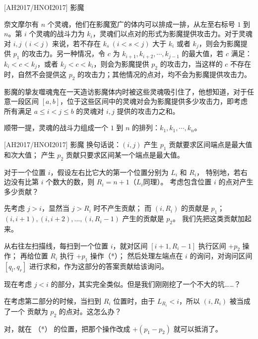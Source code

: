 \documentclass{beamer}
\begin{document}
\begin{frame}{[AH2017/HNOI2017] 影魔}
    \footnotesize

    奈文摩尔有 $n$ 个灵魂，他们在影魔宽广的体内可以排成一排，从左至右标号 $1$ 到 $n$。第 $i$ 个灵魂的战斗力为 $k_i$，灵魂们以点对的形式为影魔提供攻击力。对于灵魂对 $i, j\ (i<j)$ 来说，若不存在 $k_s\ (i<s<j)$ 大于 $k_i$ 或者 $k_j$，则会为影魔提供 $p_1$ 的攻击力。另一种情况，令 $c$ 为 $k_{i + 1}, k_{i + 2}, \cdots, k_{j -1}$ 的最大值，若 $c$ 满足：$k_i < c < k_j$，或者 $k_j < c < k_i$，则会为影魔提供 $p_2$ 的攻击力，当这样的 $c$ 不存在时，自然不会提供这 $p_2$ 的攻击力；其他情况的点对，均不会为影魔提供攻击力。

    \vspace{1em}
    影魔的挚友噬魂鬼在一天造访影魔体内时被这些灵魂吸引住了，他想知道，对于任意一段区间 $[a, b]$，位于这些区间中的灵魂对会为影魔提供多少攻击力，即考虑所有满足 $a\le i<j\le b$ 的灵魂对 $i, j$ 提供的攻击力之和。
    
    \vspace{1em}
    顺带一提，灵魂的战斗力组成一个 $1$ 到 $n$ 的排列：$k_1, k_1, \cdots, k_n$。
\end{frame}

\begin{frame}{[AH2017/HNOI2017] 影魔}
    \footnotesize
    换句话说：$(i,j)$ 产生 $p_1$ 贡献要求区间端点是最大值和次大值；
    产生 $p_2$ 贡献只要求区间某一个端点是最大值。

    \vspace{1em}
    对于一个位置 $i$，假设左右比它大的第一个位置分别为 $L_i$ 和 $R_i$，
    特别地，若右边没有比第 $i$ 个数大的数，则 $R_i=n+1$（$L_i$同理）。
    考虑包含位置 $i$ 的点对产生多少贡献？

    \vspace{1em}\pause
    先考虑 $j>i$，显然当 $j>R_i$ 时不产生贡献；
    而 $(i,R_i)$ 的贡献是 $p_1$；
     $(i,i+1),(i,i+2),...,(i,R_i-1)$ 产生的贡献是 $p_2$。
    我们先把这类贡献加起来。

    \vspace{1em}\pause
    从右往左扫描线，每扫到一个位置 $i$，就对区间 $[i+1,R_i-1]$ 执行区间 $+p_2$ 操作；
    再给位置 $R_i$ 执行 $+p_1$ 操作（*）；
    然后处理左端点在 $i$ 的询问，对询问区间 $[q_l,q_r]$ 进行求和，作为这部分的答案贡献给该询问。

    \vspace{1em}\pause
    现在考虑 $j<i$ 的部分，其实完全类似。但是我们刚刚挖了一个不大的坑……？

    \vspace{1em}\pause
    在考虑第二部分的时候，当扫到 $R_i$ 位置时，由于 $L_{R_i}<i$，所以 $(i,R_i)$ 被当成了一个
    贡献为 $p_2$ 的点对。这怎么办？

    \vspace{1em}\pause
    对，就在 （*） 的位置，把那个操作改成 $+(p_1-p_2)$ 就可以抵消了。
\end{frame}
\end{document}
